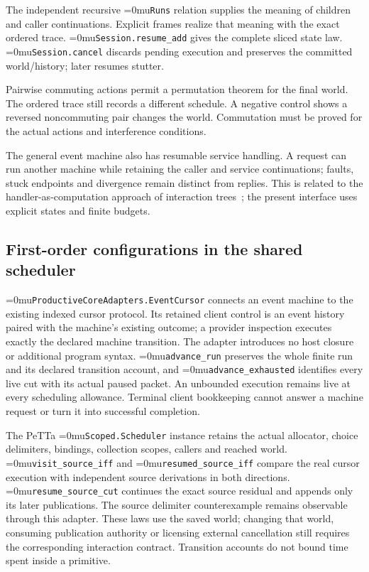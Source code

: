 \documentclass[11pt,a4paper]{article}
\newcommand{\name}[1]{\textup{\Urlmuskip=0mu\relax\nolinkurl{#1}}}
\begin{document}
The independent recursive \name{Runs} relation supplies the meaning of
children and caller continuations. Explicit frames realize that meaning with
the exact ordered trace. \name{Session.resume_add} gives the complete sliced
state law. \name{Session.cancel} discards pending execution and preserves
the committed world/history; later resumes stutter.

Pairwise commuting actions permit a permutation theorem for the final world.
The ordered trace still records a different schedule. A negative control
shows a reversed noncommuting pair changes the world. Commutation must be
proved for the actual actions and interference conditions.

The general event machine also has resumable service handling. A request can
run another machine while retaining the caller and service continuations;
faults, stuck endpoints and divergence remain distinct from replies. This is
related to the handler-as-computation approach of interaction trees~\cite{ITrees};
the present interface uses explicit states and finite budgets.

\subsection*{First-order configurations in the shared scheduler}

\name{ProductiveCoreAdapters.EventCursor} connects an event machine to the
existing indexed cursor protocol. Its retained client control is an event
history paired with the machine's existing outcome; a provider inspection
executes exactly the declared machine transition. The adapter introduces no
host closure or additional program syntax. \name{advance\_run} preserves the
whole finite run and its declared transition account, and
\name{advance\_exhausted} identifies every live cut with its actual paused
packet. An unbounded execution remains live at every scheduling allowance.
Terminal client bookkeeping cannot answer a machine request or turn it into
successful completion.

The PeTTa \name{Scoped.Scheduler} instance retains the actual allocator,
choice delimiters, bindings, collection scopes, callers and reached world.
\name{visit\_source\_iff} and \name{resumed\_source\_iff} compare the real
cursor execution with independent source derivations in both directions.
\name{resume\_source\_cut} continues the exact source residual and appends
only its later publications. The source delimiter counterexample remains
observable through this adapter. These laws use the saved world; changing
that world, consuming publication authority or licensing external cancellation
still requires the corresponding interaction contract. Transition accounts
do not bound time spent inside a primitive.
\end{document}
